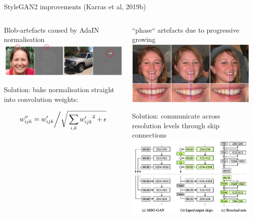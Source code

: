 \documentclass[8pt,xcolor=table,aspectratio=169]{beamer}
\begin{document}
\begin{frame}{StyleGAN2 improvements (Karras et al, 2019b)}


\begin{columns}[t]
\begin{column}{0.6\textwidth}
\centering
Blob-artefacts caused by AdaIN normalisation
\includegraphics[width=\columnwidth]{LM3Ox5i.png}

\vspace{2em}

Solution: bake normalisation straight into convolution weights:

$$w''_{ijk} = w'_{ijk} \bigg/ \sqrt{\raisebox{0mm}[4.0mm][2.5mm]{$\underset{i,k}{{}\displaystyle\sum{}}$} {w'_{ijk}}^2 + \epsilon} $$
\end{column}
\begin{column}{0.4\textwidth}
\centering
``phase`` artefacts due to progressive growing
\includegraphics[width=\columnwidth]{mTWHXPW.jpg}

\vspace{2em}
Solution: communicate across resolution levels through skip connections
\includegraphics[width=0.7\columnwidth]{XCsD745.png}

\end{column}
\end{columns}


\end{frame}
\end{document}
